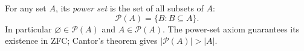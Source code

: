 
For any set $A$, its \emph{power set} is the set of all subsets of $A$:
\[
\mathcal P(A)=\{B:B\subseteq A\}.
\]
In particular $\varnothing\in\mathcal P(A)$ and $A\in\mathcal P(A)$. The power-set axiom guarantees its existence in ZFC; Cantor's theorem gives $|\mathcal P(A)|>|A|$.

